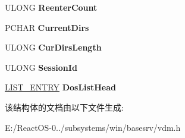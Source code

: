 \begin{DoxyCompactItemize}
\mbox{\label{struct___v_d_m___c_o_n_s_o_l_e___r_e_c_o_r_d_ade663f826015ec274b47864b8912aefc}} 
U\+L\+O\+NG {\bfseries Reenter\+Count}
\item 
\mbox{\label{struct___v_d_m___c_o_n_s_o_l_e___r_e_c_o_r_d_ab34fd25fb7197d488ac0a90b37a1d132}} 
P\+C\+H\+AR {\bfseries Current\+Dirs}
\item 
\mbox{\label{struct___v_d_m___c_o_n_s_o_l_e___r_e_c_o_r_d_acc8bf528fe669c9c60d0f4e5da646d1f}} 
U\+L\+O\+NG {\bfseries Cur\+Dirs\+Length}
\item 
\mbox{\label{struct___v_d_m___c_o_n_s_o_l_e___r_e_c_o_r_d_a4455963abf1d57023da9bf85b3e3d337}} 
U\+L\+O\+NG {\bfseries Session\+Id}
\item 
\mbox{\label{struct___v_d_m___c_o_n_s_o_l_e___r_e_c_o_r_d_ac20099f4369b2f086538e884acfd01c1}} 
\hyperlink{struct___l_i_s_t___e_n_t_r_y}{L\+I\+S\+T\+\_\+\+E\+N\+T\+RY} {\bfseries Dos\+List\+Head}
\end{DoxyCompactItemize}


该结构体的文档由以下文件生成\+:\begin{DoxyCompactItemize}
\item 
E\+:/\+React\+O\+S-\/0../subsystems/win/basesrv/vdm.\+h\end{DoxyCompactItemize}
